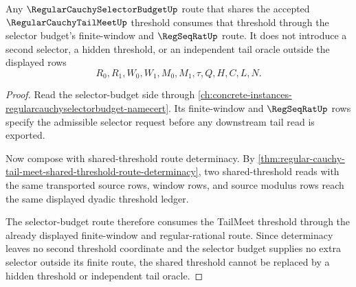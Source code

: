 \begin{theorem}
\label{thm:regular-cauchy-tail-meet-selector-budget-compatibility}
Any $\RegularCauchySelectorBudgetUp$ route that shares the accepted $\RegularCauchyTailMeetUp$ threshold consumes that threshold through the selector budget's finite-window and $\RegSeqRatUp$ route. It does not introduce a second selector, a hidden threshold, or an independent tail oracle outside the displayed rows
$$
R_0,R_1,W_0,W_1,M_0,M_1,\tau,Q,H,C,L,N.
$$
\end{theorem}
\begin{proof}
Read the selector-budget side through \autoref{ch:concrete-instances-regularcauchyselectorbudget-namecert}. Its finite-window and $\RegSeqRatUp$ rows specify the admissible selector request before any downstream tail read is exported.

Now compose with shared-threshold route determinacy. By \autoref{thm:regular-cauchy-tail-meet-shared-threshold-route-determinacy}, two shared-threshold reads with the same transported source rows, window rows, and source modulus rows reach the same displayed dyadic threshold ledger.

The selector-budget route therefore consumes the TailMeet threshold through the already displayed finite-window and regular-rational route. Since determinacy leaves no second threshold coordinate and the selector budget supplies no extra selector outside its finite route, the shared threshold cannot be replaced by a hidden threshold or independent tail oracle.
\end{proof}

